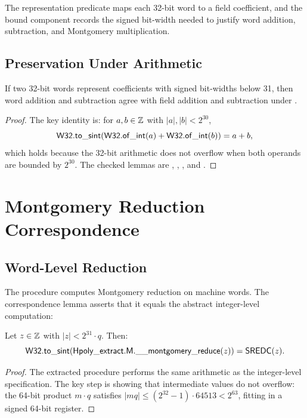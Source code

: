 The representation predicate maps each 32-bit word to a field coefficient,
and the bound component records the signed bit-width needed to justify word
addition, subtraction, and Montgomery multiplication.

\subsection{Preservation Under Arithmetic}

\begin{lemma}
  If two 32-bit words represent coefficients with signed bit-widths below
  31, then word addition and subtraction agree with field addition and
  subtraction under .
\label{lem:word-add-repr}
\end{lemma}

\begin{proof}
  The key identity is: for $a, b \in \mathbb{Z}$ with $|a|, |b| < 2^{30}$,
  \[
    \mathsf{W32.to\_sint}(\mathsf{W32.of\_int}(a) + \mathsf{W32.of\_int}(b)) = a + b,
  \]
  which holds because the 32-bit arithmetic does not overflow when both
  operands are bounded by $2^{30}$.  The checked lemmas are
  , ,
  , and .
\end{proof}

\section{Montgomery Reduction Correspondence}

\subsection{Word-Level Reduction}

The \jasmin{} procedure computes Montgomery reduction on machine words.
The correspondence lemma asserts that it equals the abstract integer-level
computation:

\begin{lemma}
  Let $z \in \mathbb{Z}$ with $|z| < 2^{31} \cdot q$.  Then:
  \[
    \mathsf{W32.to\_sint}(\mathsf{Hpoly\_extract.M.\_\_montgomery\_reduce}(z))
    = \mathsf{SREDC}(z).
  \]
\label{lem:mont_word_corr}
\end{lemma}

\begin{proof}
  The extracted procedure performs the same arithmetic as the integer-level
  specification.  The key step is showing that intermediate values do not
  overflow: the 64-bit product $m \cdot q$ satisfies $|mq| \le (2^{32}-1)
  \cdot 64513 < 2^{63}$, fitting in a signed 64-bit register.
\end{proof}

